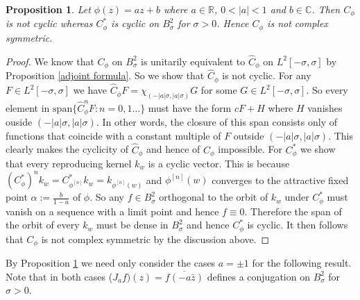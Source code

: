 \documentclass[11pt]{amsart}%
\numberwithin{equation}{section}
\theoremstyle{plain}
\newtheorem{prop}[thm]{Proposition}
\theoremstyle{definition}
\theoremstyle{definition}
\begin{document}
\begin{prop}\label{case a<1} Let $\phi(z)=az+b$ where $a\in \mathbb{R}$, $0<|a|<1$ and $b\in\mathbb{C}$. Then $C_\phi$ is not cyclic whereas $C_\phi^*$ is cyclic on $B^2_\sigma$ for $\sigma>0$. Hence $C_\phi $ is not complex symmetric.
\end{prop}
\begin{proof} We know that $C_\phi$ on $B^2_\sigma$ is unitarily equivalent to $\widehat{C}_\phi$ on $L^2[-\sigma,\sigma]$ by Proposition \ref{adjoint formula}. So we show that $\widehat{C}_\phi$ is not cyclic. For any $F\in L^2[-\sigma,\sigma]$ we have $\widehat{C}_\phi F=\chi_{(-|a|\sigma, |a|\sigma)}G$ for some $G\in L^2[-\sigma,\sigma]$. So every element in $\mathrm{span}\{\widehat{C}_\phi^n F:n=0,1\ldots\}$ must have the form $cF+H$ where $H$ vanishes ouside $(-|a|\sigma, |a|\sigma)$. In other words, the closure of this span consists only of functions that coincide with a constant multiple of $F$ outside $(-|a|\sigma, |a|\sigma)$. This clearly makes the cyclicity of $\widehat{C}_\phi$ and hence of $C_\phi$ impossible. For $C^*_\phi$ we show that every reproducing kernel $k_w$ is a cyclic vector. This is because $(C^{*}_\phi )^nk_w=C^*_{\phi^{[n]}}k_w=k_{\phi^{[n]}(w)}$ and $\phi^{[n]}(w)$ converges to the attractive fixed point $\alpha:=\frac{b}{1-a}$ of $\phi$. So any $f\in B^2_\sigma$ orthogonal to the orbit of $k_w$ under $C^*_\phi$ must vanish on a sequence with a limit point and hence $f\equiv 0$. Therefore the span of the orbit of every $k_w$ must be dense in $B^2_\sigma$ and hence $C_\phi^*$ is cyclic. It then follows that $C_\phi$ is not complex symmetric by the discussion above. 
\end{proof}

By Proposition \ref{case a<1} we need only consider the cases $a=\pm1$ for the following result. Note that in both cases ($J_af)(z)=\overline{f(-a\bar{z})}$ defines a conjugation on $B^2_\sigma$ for $\sigma>0$.
\end{document}
